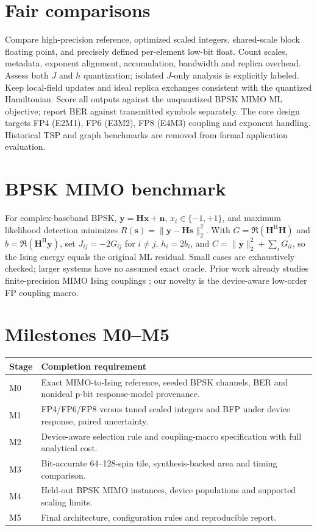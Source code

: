 \documentclass[11pt,a4paper]{article}
\begin{document}
\section{Fair comparisons}
Compare high-precision reference, optimized scaled integers, shared-scale block floating point, and precisely defined per-element low-bit float. Count scales, metadata, exponent alignment, accumulation, bandwidth and replica overhead. Assess both $J$ and $h$ quantization; isolated $J$-only analysis is explicitly labeled. Keep local-field updates and ideal replica exchanges consistent with the quantized Hamiltonian. Score all outputs against the unquantized BPSK MIMO ML objective; report BER against transmitted symbols separately. The core design targets FP4 (E2M1), FP6 (E3M2), FP8 (E4M3) coupling and exponent handling. Historical TSP and graph benchmarks are removed from formal application evaluation.
\section{BPSK MIMO benchmark}
For complex-baseband BPSK, $\mathbf{y}=\mathbf{H}\mathbf{x}+\mathbf{n}$, $x_i\in\{-1,+1\}$, and maximum likelihood detection minimizes $R(\mathbf{s})=\|\mathbf{y}-\mathbf{H}\mathbf{s}\|_2^2$. With $G=\Re(\mathbf{H}^{\mathrm H}\mathbf{H})$ and $b=\Re(\mathbf{H}^{\mathrm H}\mathbf{y})$, set $J_{ij}=-2G_{ij}$ for $i\ne j$, $h_i=2b_i$, and $C=\|\mathbf{y}\|_2^2+\sum_iG_{ii}$, so the Ising energy equals the original ML residual. Small cases are exhaustively checked; larger systems have no assumed exact oracle. Prior work already studies finite-precision MIMO Ising couplings \cite{singh2022}; our novelty is the device-aware low-order FP coupling macro.
\section{Milestones M0--M5}
\begin{center}\small
\begin{tabularx}{\linewidth}{@{}lX@{}}\toprule
Stage & Completion requirement\\\midrule
M0 & Exact MIMO-to-Ising reference, seeded BPSK channels, BER and nonideal p-bit response-model provenance.\\
M1 & FP4/FP6/FP8 versus tuned scaled integers and BFP under device response, paired uncertainty.\\
M2 & Device-aware selection rule and coupling-macro specification with full analytical cost.\\
M3 & Bit-accurate 64--128-spin tile, synthesis-backed area and timing comparison.\\
M4 & Held-out BPSK MIMO instances, device populations and supported scaling limits.\\
M5 & Final architecture, configuration rules and reproducible report.\\\bottomrule
\end{tabularx}
\end{center}
\end{document}
